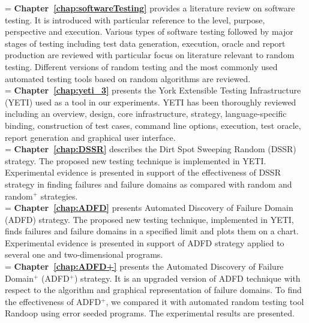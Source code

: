 \hangindent=\parindent
{}
\noindent
\textbf{Chapter~\ref{chap:softwareTesting}} provides a literature review on software testing. It is introduced with particular reference to the level, purpose, perspective and execution. Various types of software testing followed by major stages of testing including test data generation, execution, oracle and report production are reviewed with particular focus on literature relevant to random testing. Different versions of random testing and the most commonly used automated testing tools based on random algorithms are reviewed. \\


\hangindent=\parindent
{}
\noindent
\textbf{Chapter~\ref{chap:yeti_3}} presents the York Extensible Testing Infrastructure (YETI) used as a tool in our experiments. YETI has been thoroughly reviewed including an overview, design, core infrastructure, strategy, language-specific binding, construction of test cases, command line options, execution, test oracle, report generation and graphical user interface.\\

\hangindent=\parindent
{}
\noindent
\textbf{Chapter~\ref{chap:DSSR}} describes the Dirt Spot Sweeping Random (DSSR) strategy. The proposed new testing technique is implemented in YETI. Experimental evidence is presented in support of the effectiveness of DSSR strategy in finding failures and failure domains as compared with random and random$^+$ strategies. \\

\hangindent=\parindent
{}
\noindent
\textbf{Chapter~\ref{chap:ADFD}} presents Automated Discovery of Failure Domain (ADFD) strategy. The proposed new testing technique, implemented in YETI, finds failures and failure domains in a specified limit and plots them on a chart. Experimental evidence is presented in support of ADFD strategy applied to several one and two-dimensional programs. \\

 
\hangindent=\parindent
{}
\noindent
\textbf{Chapter~\ref{chap:ADFD+}} presents the Automated Discovery of Failure Domain$^+$ (ADFD$^+$) strategy. It is an upgraded version of ADFD technique with respect to the algorithm and graphical representation of failure domains. To find the effectiveness of ADFD$^+$, we compared it with automated random testing tool Randoop using error seeded programs. The experimental results are presented.\\ 


